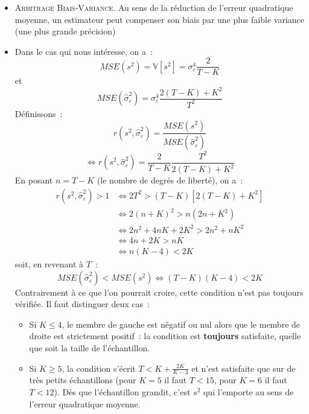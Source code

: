 \documentclass[10pt,a4paper]{article}
\theoremstyle{definition}
\renewcommand{\newline}{\unskip\par\vspace{1.5pt}}
\begin{document}
\begin{notes}
\begin{itemize}
  \item \textsc{Arbitrage Biais-Variance.} Au sens de la réduction de l'erreur quadratique moyenne, un estimateur peut compenser son biais par une plus faible variance (une plus grande précision)\newline

  \item Dans le cas qui nous intéresse, on a~:
    \[
      MSE(s^2) = \mathbb V\left[ s^2 \right] = \sigma_{\varepsilon}^4\frac{2}{T-K}
    \]
    et
    \[
      MSE(\hat{\sigma}_{\varepsilon}^2) = \sigma_{\varepsilon}^4 \frac{2(T-K)+K^2}{T^2}
    \]
    Définissons~:
    \[
      r(s^2, \hat{\sigma}_{\varepsilon}^2) = \frac{MSE(s^2)}{MSE(\hat{\sigma}_{\varepsilon}^2)}
    \]
    \[
      \Leftrightarrow r(s^2, \hat{\sigma}_{\varepsilon}^2) = \frac{2}{T-K}\frac{T^2}{2(T-K)+K^2}
    \]
    En posant $n = T-K$ (le nombre de degrés de liberté), on a~:
    \[
      \begin{split}
        r(s^2, \hat{\sigma}_{\varepsilon}^2) >1 &\Leftrightarrow 2T^2 > (T-K)\left[ 2(T-K) + K^2 \right]\\
                                                &\Leftrightarrow 2(n+K)^2 > n\left( 2n + K^2 \right)\\
                                                &\Leftrightarrow 2n^2 + 4nK + 2K^2 > 2n^2 + nK^2\\
                                                &\Leftrightarrow 4n + 2K > nK\\
                                                &\Leftrightarrow n(K-4) < 2K
      \end{split}
    \]
    soit, en revenant à $T$~:
    \[
      \boxed{MSE(\hat{\sigma}_{\varepsilon}^2) < MSE(s^2) \Leftrightarrow (T-K)(K-4)<2K}
    \]
    Contrairement à ce que l'on pourrait croire, cette condition n'est pas toujours vérifiée. Il faut distinguer deux cas~:
    \begin{itemize}
    \item Si $K\leq 4$, le membre de gauche est négatif ou nul alors que le membre de droite est strictement positif~: la condition est \textbf{toujours} satisfaite, quelle que soit la taille de l'échantillon.\newline
    \item Si $K\geq 5$, la condition s'écrit $T < K + \frac{2K}{K-4}$ et n'est satisfaite que sur de très petits échantillons (pour $K=5$ il faut $T<15$, pour $K=6$ il faut $T<12$). Dès que l'échantillon grandit, c'est $s^2$ qui l'emporte au sens de l'erreur quadratique moyenne.
    \end{itemize}


\end{itemize}
\end{notes}
\end{document}
